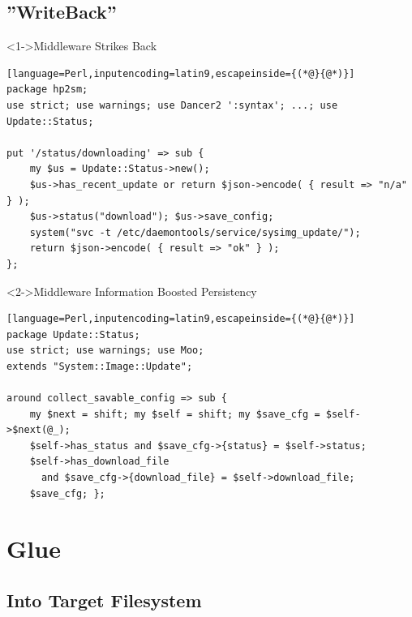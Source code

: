 \documentclass[ngerman,xcolor={table,dvipsnames},smaller,compress,hyperref={bookmarks,colorlinks}]{beamer}%
\begin{document}
\subsection{''WriteBack''}

\begin{frame}[t,fragile]

\begin{block}<1->{Middleware Strikes Back}
\scriptsize
\begin{lstlisting}[language=Perl,inputencoding=latin9,escapeinside={(*@}{@*)}]
package hp2sm;
use strict; use warnings; use Dancer2 ':syntax'; ...; use Update::Status;

put '/status/downloading' => sub {
    my $us = Update::Status->new();
    $us->has_recent_update or return $json->encode( { result => "n/a" } );
    $us->status("download"); $us->save_config;
    system("svc -t /etc/daemontools/service/sysimg_update/");
    return $json->encode( { result => "ok" } );
};
\end{lstlisting}
\end{block}

\begin{block}<2->{Middleware Information Boosted Persistency}
\scriptsize
\begin{lstlisting}[language=Perl,inputencoding=latin9,escapeinside={(*@}{@*)}]
package Update::Status;
use strict; use warnings; use Moo;
extends "System::Image::Update";

around collect_savable_config => sub {
    my $next = shift; my $self = shift; my $save_cfg = $self->$next(@_);
    $self->has_status and $save_cfg->{status} = $self->status;
    $self->has_download_file
      and $save_cfg->{download_file} = $self->download_file;
    $save_cfg; };
\end{lstlisting}
\end{block}

\end{frame}

\section{Glue}

\subsection{Into Target Filesystem}
\end{document}
